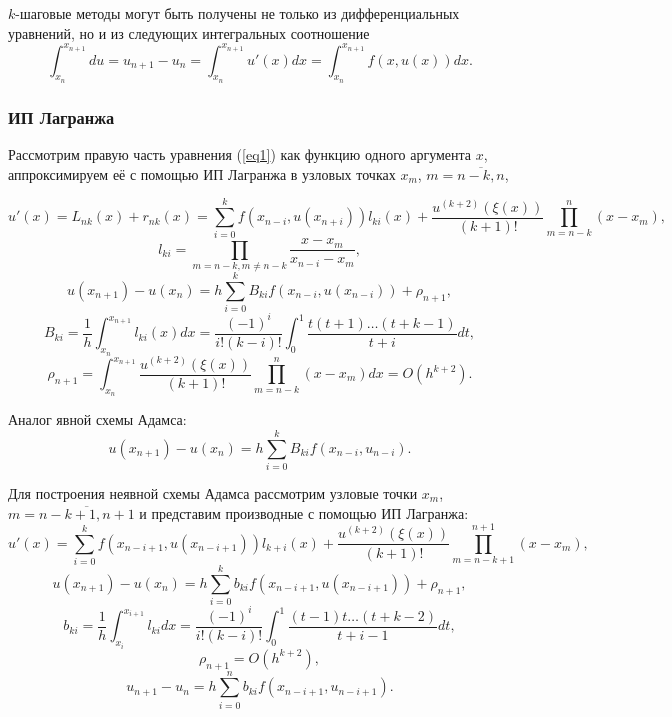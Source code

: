 \documentclass[
11pt,
master, %
subf, %
href, %
colorlinks=true, %
times, %
]{disser}
\begin{document}
$k$-шаговые методы могут быть получены не только из дифференциальных уравнений, но и из следующих интегральных соотношение
\begin{equation}\label{eq10}
  \int_{x_n}^{x_{n+1}} du = u_{n+1} - u_n = \int_{x_n}^{x_{n+1}} u'(x)dx = \int_{x_n}^{x_{n+1}} f(x,u(x))dx.
\end{equation}

\subsubsection{ИП Лагранжа}
Рассмотрим правую часть уравнения (\ref{eq1}) как функцию одного аргумента $x$, аппроксимируем её с помощью ИП Лагранжа в узловых точках $x_m$, $m = \overline{n-k, n}$,

$$u'(x) = L_{nk}(x) + r_{nk}(x) = \sum_{i=0}^{k} f(x_{n-i}, u(x_{n+i})) l_{ki}(x) + \frac{u^{(k+2)}(\xi(x))}{(k+1)!}\prod_{m=n-k}^{n}(x-x_m),$$
$$l_{ki} = \prod_{m=n-k, m\neq n-k} \frac{x-x_m}{x_{n-i} - x_m},$$
\begin{equation}\label{eq11}
  u(x_{n+1}) - u(x_n) = h\sum_{i=0}^{k} B_{ki} f(x_{n-i}, u(x_{n-i})) + \rho_{n+1},
\end{equation}
$$B_{ki} = \frac{1}{h} \int_{x_n}^{x_{n+1}} l_{ki}(x) dx = \frac{(-1)^i}{i!(k-i)!} \int_{0}^{1} \frac{t(t+1)\ldots (t+k-1)}{t+i} dt,$$
$$\rho_{n+1} = \int_{x_n}^{x_{n+1}} \frac{u^{(k+2)}(\xi(x))}{(k+1)!} \prod_{m = n-k}^{n} (x-x_m) dx = O(h^{k+2}).$$

Аналог явной схемы Адамса:
\begin{equation}\label{eq12}
  u(x_{n+1}) - u(x_n) = h\sum_{i=0}^{k} B_{ki} f(x_{n-i}, u_{n-i}).
\end{equation}

Для построения неявной схемы Адамса рассмотрим узловые точки $x_m$, $m = \overline{n-k+1, n+1}$ и представим производные с помощью ИП Лагранжа:
$$u'(x) = \sum_{i=0}^{k} f(x_{n-i+1}, u(x_{n-i+1})) l_{k+i}(x) + \frac{u^{(k+2)}(\xi(x))}{(k+1)!}\prod_{m = n-k+1}^{n+1} (x-x_m),$$
$$u(x_{n+1}) - u(x_n) = h\sum_{i=0}^{k} b_{ki} f(x_{n-i+1}, u(x_{n-i+1})) + \rho_{n+1},$$
$$b_{ki} = \frac{1}{h} \int_{x_i}^{x_{i+1}} l_{ki}dx = \frac{(-1)^i}{i!(k-i)!} \int_{0}^{1} \frac{(t-1)t\ldots (t+k-2)}{t+i-1}dt,$$
$$\rho_{n+1} = O(h^{k+2}),$$
\begin{equation}\label{eq13}
  u_{n+1} - u_n = h\sum_{i=0}^{n} b_{ki} f(x_{n-i+1}, u_{n-i+1}).
\end{equation}
\end{document}
